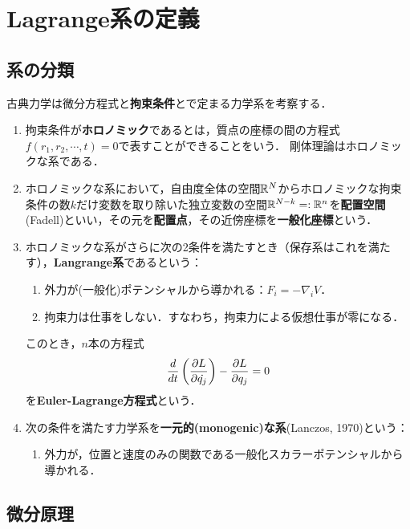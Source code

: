 \documentclass[uplatex, dvipdfmx]{jsreport}
\begin{document}
\section{Lagrange系の定義}

\subsection{系の分類}

\begin{definition}
    古典力学は微分方程式と\textbf{拘束条件}とで定まる力学系を考察する．
    \begin{enumerate}
        \item 拘束条件が\textbf{ホロノミック}であるとは，質点の座標の間の方程式$f(r_1,r_2,\cdots,t)=0$で表すことができることをいう．
        剛体理論はホロノミックな系である．
        \item ホロノミックな系において，自由度全体の空間$\mathbb{R}^N$からホロノミックな拘束条件の数$k$だけ変数を取り除いた独立変数の空間$\mathbb{R}^{N-k}=:\mathbb{R}^n$を\textbf{配置空間}(Fadell)といい，その元を\textbf{配置点}，その近傍座標を\textbf{一般化座標}という．
        \item ホロノミックな系がさらに次の2条件を満たすとき（保存系はこれを満たす），\textbf{Langrange系}であるという：
        \begin{enumerate}[({L}1)]
            \item 外力が(一般化)ポテンシャルから導かれる：$F_i=-\nabla_iV$．
            \item 拘束力は仕事をしない．すなわち，拘束力による仮想仕事が零になる．
        \end{enumerate}
        このとき，$n$本の方程式
        \[\frac{d }{d t}\left(\frac{\partial L}{\partial \dot{q_j}}\right)-\frac{\partial L}{\partial q_j}=0\]
        を\textbf{Euler-Lagrange方程式}という．
        \item 次の条件を満たす力学系を\textbf{一元的(monogenic)な系}(Lanczos, 1970\cite{Goldstein1})という：
        \begin{enumerate}[({H}1)]
            \item 外力が，位置と速度のみの関数である一般化スカラーポテンシャルから導かれる．
        \end{enumerate}
    \end{enumerate}
\end{definition}

\subsection{微分原理}
\end{document}

